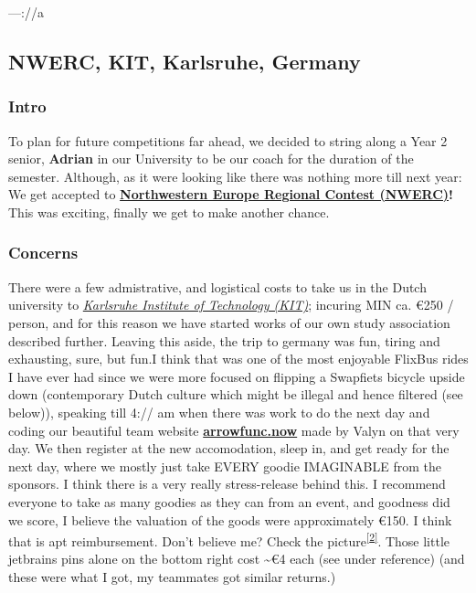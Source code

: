 \documentclass[
]{article}
\begin{document}
---://a

\subsection{\texorpdfstring{\hyperref[NWERC-KIT-Karlsruhe-Germany]{}NWERC, KIT, Karlsruhe, Germany}{NWERC, KIT, Karlsruhe, Germany}}\label{NWERC-KIT-Karlsruhe-Germany}

\subsubsection{\texorpdfstring{\hyperref[Intro-2]{}Intro}{Intro}}\label{Intro-2}

To plan for future competitions far ahead, we decided to string along a Year 2 senior, \textbf{Adrian} in our University to be our coach for the duration of the semester. Although, as it were looking like there was nothing more till next year: We get accepted to \textbf{\href{https://2025.nwerc.eu}{Northwestern Europe Regional Contest (NWERC)}!} This was exciting, finally we get to make another chance.

\subsubsection{\texorpdfstring{\hyperref[Concerns]{}Concerns}{Concerns}}\label{Concerns}

There were a few admistrative, and logistical costs to take us in the Dutch university to \emph{\href{https://kit.edu}{Karlsruhe Institute of Technology (KIT)}}; incuring MIN ca. €250 / person, and for this reason we have started works of our own study association described further. Leaving this aside, the trip to germany was fun, tiring and exhausting, sure, but fun.I think that was one of the most enjoyable FlixBus rides I have ever had since we were more focused on flipping a Swapfiets bicycle upside down (contemporary Dutch culture which might be illegal and hence filtered (see below)), speaking till 4:// am when there was work to do the next day and coding our beautiful team website \textbf{\href{https://arrowfunc.now}{arrowfunc.now}} made by Valyn on that very day. We then register at the new accomodation, sleep in, and get ready for the next day, where we mostly just take EVERY goodie IMAGINABLE from the sponsors. I think there is a very really stress-release behind this. I recommend everyone to take as many goodies as they can from an event, and goodness did we score, I believe the valuation of the goods were approximately €150. I think that is apt reimbursement. Don't believe me? Check the picture\textsuperscript{\hyperref[fn:2]{{{[}2{]}}}}. Those little jetbrains pins alone on the bottom right cost \textasciitilde€4 each (see under reference) (and these were what I got, my teammates got similar returns.)
\end{document}
